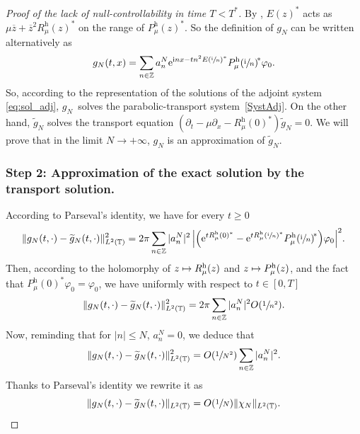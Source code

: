 \documentclass[JEP,XML,SOM,Unicode,NoEqCountersInSection]{cedram}
\def\mto{\mathchoice{\longmapsto}{\mapsto}{\mapsto}{\mapsto}}
\theoremstyle{plain}
\theoremstyle{definition}
\theoremstyle{remark}
\let\bigO O
\newcommand{\set}{\mathbb}
\newcommand{\h}{{\mathrm h}}
\newcommand{\eu}{\mathrm e}
\newcommand{\iu}{\mathrm i}
\let\originalleft\left
\let\originalright\right
\renewcommand{\left}{\mathopen{}\mathclose\bgroup\originalleft}
\renewcommand{\right}{\aftergroup\egroup\originalright}
\newcommand{\iun}{\left(\sfrac{\iu}{n}\right)}
\begin{document}
\begin{proof}[Proof of the lack of null-controllability in time $T<T^*$]
By , $E(z)^*$ acts as $\mu\overline z + \overline z^2 R_\mu^\h(z)^*$ on the range of $P_\mu^\h(z)^*$. So the definition of $g_N$ can be written alternatively as
\[
g_N(t,x) = \sum_{n\in\set Z} a_n^N
\eu^{\iu nx-tn^2 E\iun^*}P_\mu^\h\iun^{\!*}\varphi_0.
\]
So, according to the representation of the solutions of the adjoint system \eqref{eq:sol_adj}, $g_N$~solves the parabolic-transport system~\eqref{SystAdj}. On the other hand, $\widetilde g_N$ solves the transport equation $(\partial_t-\mu\partial_x -R_\mu^\h(0)^*)\widetilde g_N = 0$. We will prove that in the limit $N\to +\infty$, $g_N$ is an approximation of $\widetilde g_N$.

\subsubsection*{Step 2: Approximation of the exact solution by the transport solution.}
According to Parseval's identity, we have for every $t\geq 0$
\[
\lVert g_N(t,\cdot)-\widetilde g_N(t,\cdot)\rVert^2_{L^2(\set T)}
= 2\pi\sum_{n\in\set Z} |a_n^N|^2\,\left| \left(
\eu^{tR_\mu^\h(0)^*} - \eu^{tR_\mu^\h\iun^*}P_\mu^\h\iun^{\!*}
\right)\varphi_0\right|^2.
\]
Then, according to the holomorphy of $z\mto R_\mu^\h(z)$ and $z\mto P_\mu^\h(z)$, and the fact that $P_\mu^\h(0)^*\varphi_0 = \varphi_0$, we have uniformly with respect to $t\in [0,T]$
\[
\lVert g_N(t,\cdot)-\widetilde g_N(t,\cdot)\rVert^2_{L^2(\set T)}
= 2\pi\sum_{n\in\set Z} |a_n^N|^2\bigO(\sfrac1{n^2}).
\]
Now, reminding that for $|n|\leq N$, $a_n^N = 0$, we deduce that
\[
\lVert g_N(t,\cdot)-\widetilde g_N(t,\cdot)\rVert^2_{L^2(\set T)}
= \bigO\left(\sfrac1{N^2}\right)\sum_{n\in\set Z} |a_n^N|^2.
\]
Thanks to Parseval's identity we rewrite it as
\begin{equation}
\label{eq:approx_gN}
\lVert g_N(t,\cdot)-\widetilde g_N(t,\cdot)\rVert_{L^2(\set T)} =
\bigO\left(\sfrac 1N\right)\lVert\chi_N\rVert_{L^2(\set T)}.
\end{equation}


\end{proof}
\end{document}
